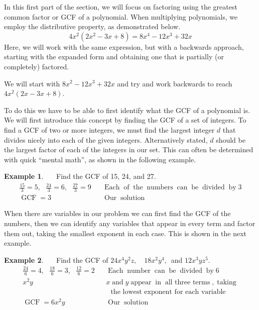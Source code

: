 \documentclass[12pt]{book}
\theoremstyle{definition}
\newtheorem{example}{Example}
\newcommand{\tmop}[1]{\ensuremath{\operatorname{#1}}}
\begin{document}
In this first part of the section, we will focus on factoring using the greatest common factor or GCF of a polynomial.  When multiplying polynomials, we employ the distributive property, as demonstrated below.
$$4 x^2 (2 x^2 - 3 x + 8) = 8 x^4 - 12 x^3 + 32 x$$
Here, we will work with the same expression, but with a backwards approach, starting with the expanded form and obtaining one that is partially (or completely) factored.\par
We will start with $8 x^2 - 12 x^3 + 32 x$ and try and work backwards to reach $4 x^2 (2 x - 3 x + 8)$.\par
To do this we have to be able to first identify what the GCF of a polynomial is. We will first introduce this concept by finding the GCF of
a set of integers. To find a GCF of two or more integers, we must find the largest integer $d$ that divides nicely into each of the given integers.  Alternatively stated, $d$ should be the largest factor of each of the integers in our set.  This can often be determined with quick ``mental math'', as shown in the following example.

\begin{example}~~~Find the GCF of 15, 24, and 27.
  \begin{eqnarray*}
    \frac{15}{3} = 5,~~~ \frac{24}{3} = 6,~~~ \frac{27}{3} = 9 &  & \tmop{Each}
    \tmop{of} \tmop{the} \tmop{numbers} \tmop{can} \tmop{be} \tmop{divided}
    \tmop{by} 3\\
    \tmop{GCF} = 3 &  & \tmop{Our} \tmop{solution}
  \end{eqnarray*}
\end{example}

When there are variables in our problem we can first find the GCF of the numbers, then we can identify any variables that appear in every term and factor them out, taking the smallest exponent in each case. This is shown in the next example.

\begin{example}~~~Find the GCF of $24 x^4 y^2 z,$~~$18 x^2 y^4,$~and $12 x^3 y z^5$.
  \begin{eqnarray*}
    \frac{24}{6} = 4,~~~ \frac{18}{6} = 3,~~~ \frac{12}{6} = 2 &  & \tmop{Each}
    \tmop{number} \tmop{can} \tmop{be} \tmop{divided} \tmop{by} 6\\
    x^2 y &  & x \tmop{and} y \tmop{appear} \tmop{in} \tmop{all~three~terms}, \tmop{taking}\\
		& & ~~~\text{the~lowest~exponent~for~each~variable}\\
    \tmop{GCF} = 6 x^2 y &  & \tmop{Our} \tmop{solution}
  \end{eqnarray*}
\end{example}
  
\end{document}
